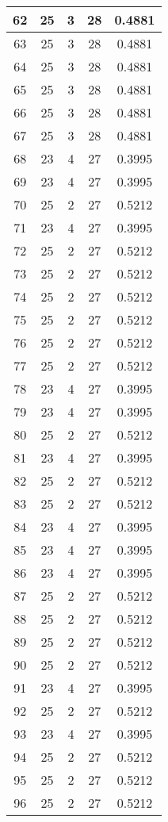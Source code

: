 \documentclass[letterpaper, 12pt]{article}
\begin{document}
\begin{longtable}{|c|c|c|c|c|}
\hline
62 & 25 & 3 & 28 & 0.4881 \\
\hline
63 & 25 & 3 & 28 & 0.4881 \\
\hline
64 & 25 & 3 & 28 & 0.4881 \\
\hline
65 & 25 & 3 & 28 & 0.4881 \\
\hline
66 & 25 & 3 & 28 & 0.4881 \\
\hline
67 & 25 & 3 & 28 & 0.4881 \\
\hline
68 & 23 & 4 & 27 & 0.3995 \\
\hline
69 & 23 & 4 & 27 & 0.3995 \\
\hline
70 & 25 & 2 & 27 & 0.5212 \\
\hline
71 & 23 & 4 & 27 & 0.3995 \\
\hline
72 & 25 & 2 & 27 & 0.5212 \\
\hline
73 & 25 & 2 & 27 & 0.5212 \\
\hline
74 & 25 & 2 & 27 & 0.5212 \\
\hline
75 & 25 & 2 & 27 & 0.5212 \\
\hline
76 & 25 & 2 & 27 & 0.5212 \\
\hline
77 & 25 & 2 & 27 & 0.5212 \\
\hline
78 & 23 & 4 & 27 & 0.3995 \\
\hline
79 & 23 & 4 & 27 & 0.3995 \\
\hline
80 & 25 & 2 & 27 & 0.5212 \\
\hline
81 & 23 & 4 & 27 & 0.3995 \\
\hline
82 & 25 & 2 & 27 & 0.5212 \\
\hline
83 & 25 & 2 & 27 & 0.5212 \\
\hline
84 & 23 & 4 & 27 & 0.3995 \\
\hline
85 & 23 & 4 & 27 & 0.3995 \\
\hline
86 & 23 & 4 & 27 & 0.3995 \\
\hline
87 & 25 & 2 & 27 & 0.5212 \\
\hline
88 & 25 & 2 & 27 & 0.5212 \\
\hline
89 & 25 & 2 & 27 & 0.5212 \\
\hline
90 & 25 & 2 & 27 & 0.5212 \\
\hline
91 & 23 & 4 & 27 & 0.3995 \\
\hline
92 & 25 & 2 & 27 & 0.5212 \\
\hline
93 & 23 & 4 & 27 & 0.3995 \\
\hline
94 & 25 & 2 & 27 & 0.5212 \\
\hline
95 & 25 & 2 & 27 & 0.5212 \\
\hline
96 & 25 & 2 & 27 & 0.5212 \\

\end{longtable}
\end{document}
